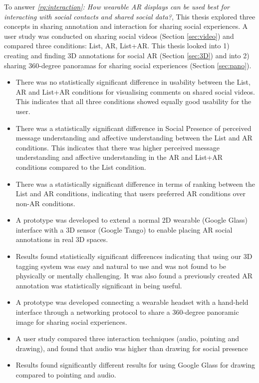 \noindent
To answer \textit{\ref{rq:interaction}: How wearable AR displays can be used best for interacting with social contacts and shared social data?}, This thesis explored three concepts in sharing annotation and interaction for sharing social experiences. A user study was conducted on sharing social videos (Section \ref{sec:video}) and compared three conditions: List, AR, List+AR. This thesis looked into 1) creating and finding 3D annotations for social AR (Section \ref{sec:3D}) and into 2) sharing 360-degree panoramas for sharing social experiences (Section \ref{sec:pano}). 

\begin{itemize}
    \item{There was no statistically significant difference in usability between the List, AR and List+AR conditions for visualising comments on shared social videos. This indicates that all three conditions showed equally good usability for the user.}
    \item{There was a statistically significant difference in Social Presence of perceived message understanding and affective understanding between the List and AR conditions. This indicates that there was higher perceived message understanding and affective understanding in the AR and List+AR conditions compared to the List condition.}
    \item{There was a statistically significant difference in terms of ranking between the List and AR conditions, indicating that users preferred AR conditions over non-AR conditions.}
    \item{A prototype was developed to extend a normal 2D wearable (Google Glass) interface with a 3D sensor (Google Tango) to enable placing AR social annotations in real 3D spaces.}
    \item{Results found statistically significant differences indicating that using our 3D tagging system was easy and natural to use and was not found to be physically or mentally challenging. It was also found a previously created AR annotation was statistically significant in being useful.}
    \item{A prototype was developed connecting a wearable headset with a hand-held interface through a networking protocol to share a 360-degree panoramic image for sharing social experiences.}
    \item{A user study compared three interaction techniques (audio, pointing and drawing), and found that audio was higher than drawing for social presence}
    \item{Results found significantly different results for using Google Glass for drawing compared to pointing and audio.}
\end{itemize}

